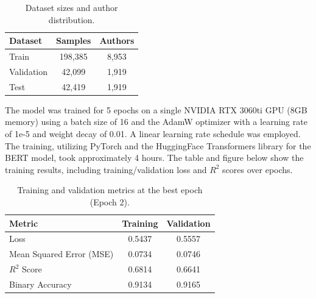 \documentclass[twoside]{ctuthesis}
\theoremstyle{plain}
\theoremstyle{definition}
\theoremstyle{note}
\begin{document}
\begin{table}[ht]
    \centering
    \caption{Dataset sizes and author distribution.}
    \label{tab:dataset_sizes}
    \begin{tabular}{lcc}
        \toprule
        \textbf{Dataset} & \textbf{Samples} & \textbf{Authors} \\
        \midrule
        Train       & 198,385 & 8,953 \\
        Validation  & 42,099  & 1,919 \\
        Test        & 42,419  & 1,919 \\
        \bottomrule
    \end{tabular}
\end{table}

The model was trained for 5 epochs on a single NVIDIA RTX 3060ti GPU (8GB memory) using a batch size of 16 and the AdamW optimizer with a learning rate of 1e-5 and weight decay of 0.01. A linear learning rate schedule was employed. The training, utilizing PyTorch and the HuggingFace Transformers library for the BERT model, took approximately 4 hours. The table and figure below show the training results, including training/validation loss and $R^2$ scores over epochs.\par

\begin{table}[ht]
    \centering
    \caption{Training and validation metrics at the best epoch (Epoch 2).}
    \label{tab:best_epoch_results}
    \begin{tabular}{lcc}
        \toprule
        \textbf{Metric} & \textbf{Training} & \textbf{Validation} \\
        \midrule
        Loss            & 0.5437 & 0.5557 \\
        Mean Squared Error (MSE) & 0.0734 & 0.0746 \\
        $R^2$ Score     & 0.6814 & 0.6641 \\
        Binary Accuracy & 0.9134 & 0.9165 \\
        \bottomrule
    \end{tabular}
\end{table}
\end{document}
